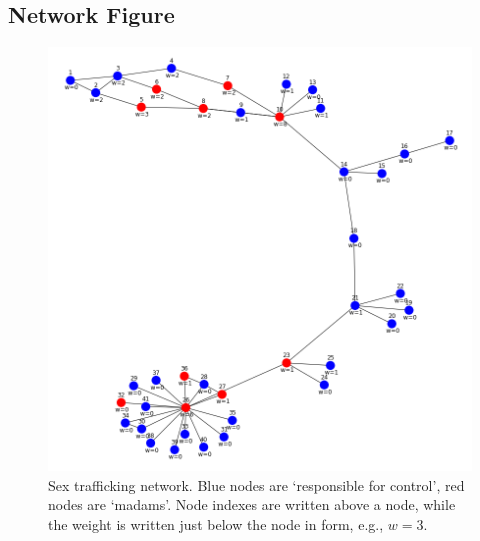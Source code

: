 \documentclass[10p]{article}
\theoremstyle{definition}
\theoremstyle{definition}
\begin{document}


\newpage

\begin{appendices} 
\section{Network Figure}  \label{AppendixNetwork}
\begin{figure}[ht]
\centering
    \includegraphics[angle=0,scale=0.5]{network.png}%
    \caption{Sex trafficking network. Blue nodes are `responsible for control', red nodes are `madams'. Node indexes are written above a node, while the weight is written just below the node in form, e.g., $w=3$.}
    \label{fig:PropProf}
\end{figure}
\newpage 

\end{appendices}
\end{document}
